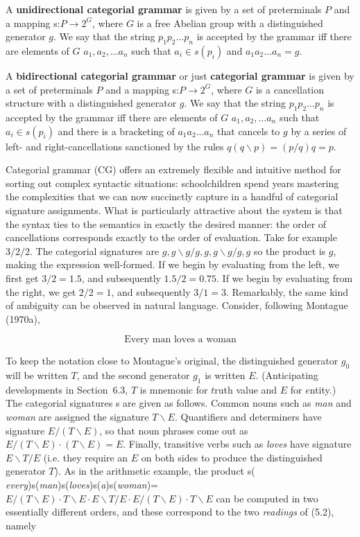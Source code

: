 A {\bf unidirectional categorial grammar} is given by a set of preterminals
$P$ and a mapping s:$P \rightarrow 2^G$, where $G$ is a free Abelian group
with a distinguished generator $g$. We say that the string $p_1 p_2 \ldots
p_n$ is accepted by the grammar iff there are elements of $G$ $a_1, a_2,
\ldots a_n$ such that $a_i \in s(p_i)$ and $a_1 a_2 \ldots a_n = g$.

A {\bf bidirectional categorial grammar} or just {\bf categorial grammar} is
given by a set of preterminals $P$ and a mapping s:$P \rightarrow 2^G$, where
$G$ is a cancellation structure with a distinguished generator $g$. We say
that the string $p_1 p_2 \ldots p_n$ is accepted by the grammar iff there are
elements of $G$ $a_1, a_2, \ldots a_n$ such that $a_i \in s(p_i)$ and there is
a bracketing of $a_1 a_2 \ldots a_n$ that cancels to $g$ by a series of left-
and right-cancellations sanctioned by the rules $q(q \backslash p)=(p/q)q=p$.

Categorial grammar (CG) offers an extremely flexible and intuitive method for
sorting out complex syntactic situations: schoolchildren spend years mastering
the complexities that we can now succinctly capture in a handful of categorial
signature assignments. What is particularly attractive about the system is
that the syntax ties to the semantics in exactly the desired manner: the order
of cancellations corresponds exactly to the order of evaluation.  Take for
example $3/2/2$. The categorial signatures are $g,g \backslash g/g,g,g
\backslash g/g,g$ so the product is $g$, making the expression well-formed.
If we begin by evaluating from the left, we first get $3/2=1.5$, and
subsequently $1.5/2=0.75$. If we begin by evaluating from the right, we get
$2/2=1$, and subsequently $3/1=3$.  Remarkably, the same kind of ambiguity can
be observed in natural language. Consider, following Montague (1970a),

\begin{equation} 
\mbox{Every man loves a woman}
\end{equation}

\noindent 
To keep the notation close to Montague's original, the distinguished generator
$g_0$ will be written $T$, and the second generator $g_1$ is written $E$.
(Anticipating developments in Section~6.3, $T$ is mnemonic for $t$ruth value
and $E$ for $e$ntity.) The categorial signatures s are given as follows.
Common nouns such as {\it man} and {\it woman} are assigned the signature $T
\backslash E$.  Quantifiers and determiners have signature $E/(T \backslash
E)$, so that noun phrases come out as $E/(T \backslash E) \cdot (T \backslash
E) = E$.  Finally, transitive verbs such as {\it loves} have signature $E
\backslash T/E$ (i.e. they require an $E$ on both sides to produce the
distinguished generator $T$). As in the arithmetic example, the product s({\it
  every})s({\it man})s({\it loves})s({\it a})s({\it woman})= $E/(T \backslash
E) \cdot T \backslash E \cdot E \backslash T/E \cdot E/(T \backslash E) \cdot
T \backslash E$ can be computed in two essentially different orders, and these
correspond to the two {\it readings} of (5.2), namely

